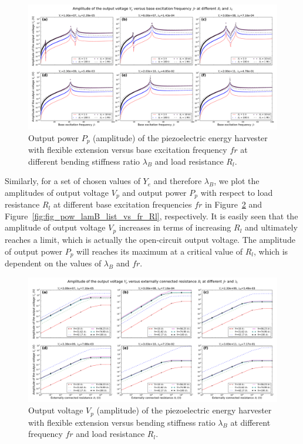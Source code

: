 \documentclass{elsarticle}
\begin{document}
\begin{figure}[!htbp]
    \centering
    \includegraphics[width=\textwidth]{./fig_output_power_vs_fr_Rl_lamB_all}
    \caption{Output power $P_p$ (amplitude) of the piezoelectric energy harvester with flexible extension versus base excitation frequency $fr$ at different bending stiffness ratio $\lambda_B$ and load resistance $R_l$. \color{red}{to be revised in the legend. change figure title} }
    \label{fig:fig_output_power_vs_fr_Rl_lamB_all}
\end{figure}


Similarly, for a set of chosen values of $Y_e$ and therefore $\lambda_B$, we plot the amplitudes of output voltage $V_p$ and output power $P_p$ with respect to load resistance $R_l$ at different base excitation frequencies $fr$ in Figure~\ref{fig:fig_vol_lamB_list_vs_fr_Rl} and Figure~\ref{fig:fig_pow_lamB_list_vs_fr_Rl}, respectively. It is easily seen that the amplitude of output voltage $V_p$ increases in terms of increasing $R_l$ and ultimately reaches a limit, which is actually the open-circuit output voltage. The amplitude of output power $P_p$ will reaches its maximum at a critical value of $R_l$, which is dependent on the values of $\lambda_B$ and $fr$. 

\begin{figure}[!htbp]
    \centering
    \includegraphics[width=\textwidth]{./fig_vol_lamB_list_vs_fr_Rl}
    \caption{Output voltage $V_p$ (amplitude) of the piezoelectric energy harvester with flexible extension versus bending stiffness ratio $\lambda_B$ at different frequency $fr$ and load resistance $R_l$.  \color{red}{to be revised in the legend. change figure title} }
    \label{fig:fig_vol_lamB_list_vs_fr_Rl}
\end{figure}
\end{document}
